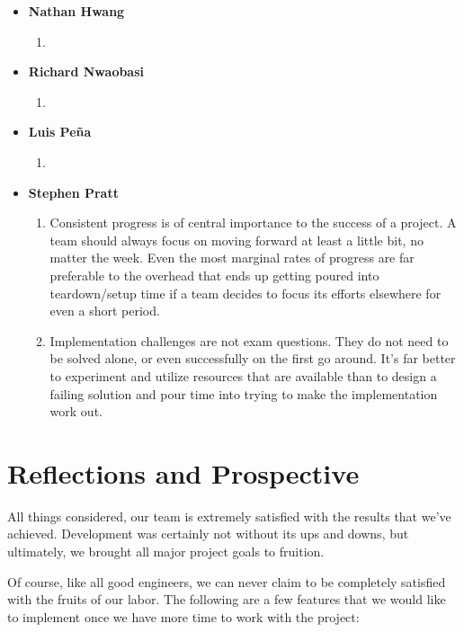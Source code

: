 \documentclass{article}
\begin{document}
\begin{itemize}

\item
\textbf{Nathan Hwang}
\begin{enumerate}
\item 
\end{enumerate}

\item 
\textbf{Richard Nwaobasi}
\begin{enumerate}
\item 
\end{enumerate}

\item 
\textbf{Luis Pe\~{n}a}
\begin{enumerate}
\item 
\end{enumerate}

\item 
\textbf{Stephen Pratt}
\begin{enumerate}
\item Consistent progress is of central importance to the success of a project. A team should always focus on 
moving forward at least a little bit, no matter the week. Even the most marginal rates of progress are far preferable
to the overhead that ends up getting poured into teardown/setup time if a team decides to focus its efforts elsewhere
for even a short period.
\item Implementation challenges are not exam questions. They do not need to be solved alone, or even successfully on 
the first go around. It's far better to experiment and utilize resources that are available than to design a failing
solution and pour time into trying to make the implementation work out.
\end{enumerate}

\end{itemize}


\section{Reflections and Prospective}

All things considered, our team is extremely satisfied with the results that we've achieved. 
Development was certainly not without its ups and downs, but ultimately, we brought all major project
goals to fruition. 

Of course, like all good engineers, we can never claim to be completely satisfied with the fruits of our
labor. The following are a few features that we would like to implement once we have more time 
to work with the project:
\end{document}

